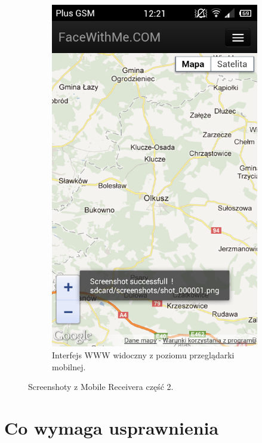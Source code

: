 \begin{figure}[ht]
\begin{subfigure}{0.3\textwidth}
        \includegraphics[width=\textwidth]{img/screens/mobile_broadcaster/interfejs-www.png}
        \caption{Interfejs WWW widoczny z poziomu przeglądarki mobilnej.}
        \label{fig:MB5}
    \end{subfigure}
    \caption{Screenshoty z Mobile Receivera część 2.}
\end{figure}

\newpage
\section{Co wymaga usprawnienia}


